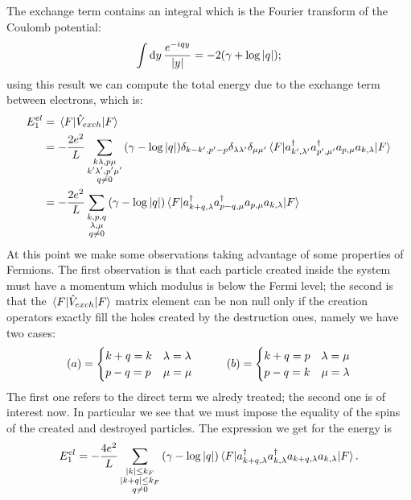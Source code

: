 \documentclass[a4paper]{article}
\begin{document}
The exchange term contains an integral which is the Fourier transform of the Coulomb potential:
\begin{equation}
\int \dd{y} \frac{e^{-iqy}}{\abs{y}} = -2\pqty{\gamma + \log{\abs{q}}};
\end{equation}
using this result we can compute the total energy due to the exchange term between electrons, which is:
\begin{align}
E_1^{el} &= \mel{F}{\hat{V}_{exch}}{F} \\
&= -\frac{2e^2}{L}\sum_{\substack{k\lambda,p\mu\\k'\lambda',p'\mu'\\q\neq0}} \pqty{\gamma - \log{\abs{q}}}\delta_{k-k',p'-p}\delta_{\lambda\lambda'}\delta_{\mu\mu'} \mel{F}{a^\dag_{k',\lambda'}a^\dag_{p',\mu'}a_{p,\mu}a_{k,\lambda}}{F}\\
&= -\frac{2e^2}{L}\sum_{\substack{k,p,q\\\lambda,\mu \\ q\neq0}}\pqty{\gamma - \log{\abs{q}}}\mel{F}{a^\dag_{k+q,\lambda}a^\dag_{p-q,\mu}a_{p,\mu}a_{k,\lambda}}{F}
\end{align}
At this point we make some observations taking advantage of some properties of Fermions.
The first observation is that each particle created inside the system must have a momentum which modulus is below the Fermi level; the second is that the $\mel{F}{\hat{V}_{exch}}{F}$ matrix element can be non null only if the creation operators exactly fill the holes created by the destruction ones, namely we have two cases:
\begin{align} 
&\pqty{a} = \begin{cases}
k+q = k & \lambda = \lambda\\
p-q = p & \mu = \mu
\end{cases} &
\qquad \pqty{b}=\begin{cases}
k+q=p & \lambda= \mu\\
p-q = k & \mu = \lambda
\end{cases}
\end{align}
The first one refers to the direct term we alredy treated; the second one is of interest now.
In particular we see that we must impose the equality of the spins of the created and destroyed particles.
The expression we get for the energy is
\begin{equation}
E_1^{el} = -\frac{4e^2}{L}\sum_{\substack{\abs{k}\leq k_F\\ \abs{k+q}\leq k_F\\q\neq0}}\pqty{\gamma - \log{\abs{q}}}\mel{F}{a^\dag_{k+q,\lambda}a^\dag_{k,\lambda}a_{k+q,\lambda}a_{k,\lambda}}{F}.
\end{equation}
\end{document}
